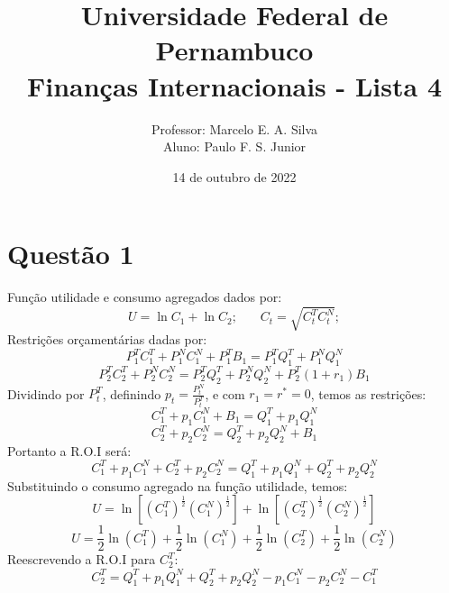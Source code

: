 \documentclass{article}
\title{Universidade Federal de Pernambuco \\
Finanças Internacionais - Lista 4}
\author{Professor: Marcelo E. A. Silva \\ Aluno: Paulo F. S. Junior}
\date{14 de outubro de 2022}
\begin{document}
\maketitle %


\section*{Questão 1}
Função utilidade e consumo agregados dados por:
\begin{equation*}
    U = \ln C_1 + \ln C_2; \>\>\>\>\>\>\>\>
    C_t = \sqrt{C_t^T C_t^N};
\end{equation*}
Restrições orçamentárias dadas por:
\begin{equation*}
    P_1^T C_1^T + P_1^N C_1^N + P_1^T B_1 = P_1^T Q_1^T + P_1^N Q_1^N
\end{equation*}
\begin{equation*}
    P_2^T C_2^T + P_2^N C_2^N  = P_2^T Q_2^T + P_2^N Q_2^N + P_2^T(1+r_1)B_1
\end{equation*}
Dividindo por $P_t^T$, definindo $p_t = \frac{P_t^N}{P_t^T}$, e com $r_1=r^*=0$, temos as restrições:
\begin{equation*}
    C_1^T + p_1 C_1^N + B_1 = Q_1^T + p_1 Q_1^N 
\end{equation*}
\begin{equation*}
    C_2^T + p_2 C_2^N  = Q_2^T + p_2 Q_2^N + B_1
\end{equation*}
Portanto a R.O.I será:
\begin{equation*}\label{eq:1roi}
    C_1^T + p_1 C_1^N + C_2^T + p_2 C_2^N = Q_1^T + p_1 Q_1^N + Q_2^T + p_2 Q_2^N
\end{equation*}
Substituindo o consumo agregado na função utilidade, temos:
\begin{equation*}
    U = \ln \left[(C_1^T)^\frac{1}{2}(C_1^N)^\frac{1}{2}\right] + \ln\left[ (C_2^T)^\frac{1}{2}(C_2^N)^\frac{1}{2}\right]
\end{equation*}
\begin{equation*}
    U = \frac{1}{2}\ln (C_1^T) + \frac{1}{2}\ln(C_1^N) + \frac{1}{2}\ln (C_2^T)+ \frac{1}{2}\ln (C_2^N)
\end{equation*}
Reescrevendo a R.O.I para $C_2^T$:
\begin{equation*}
    C_2^T  = 
    Q_1^T + p_1 Q_1^N + Q_2^T + p_2 Q_2^N - p_1 C_1^N - p_2 C_2^N - C_1^T
\end{equation*}
\end{document}
